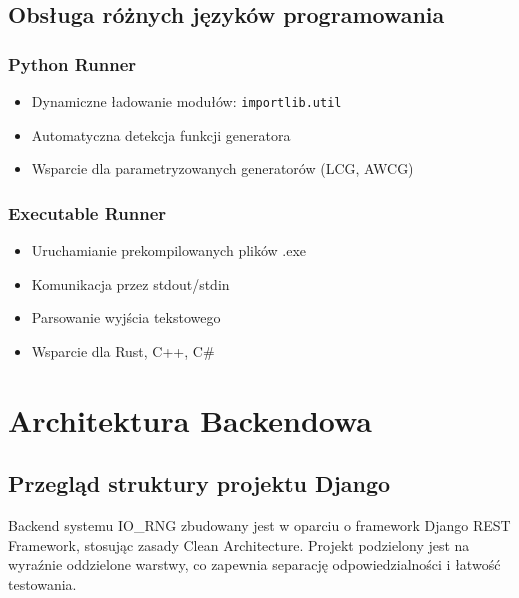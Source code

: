 \documentclass[12pt,a4paper]{article}
\begin{document}
\subsection{Obsługa różnych języków programowania}

\subsubsection{Python Runner}

\begin{itemize}
    \item Dynamiczne ładowanie modułów: \texttt{importlib.util}
    \item Automatyczna detekcja funkcji generatora
    \item Wsparcie dla parametryzowanych generatorów (LCG, AWCG)
\end{itemize}

\subsubsection{Executable Runner}

\begin{itemize}
    \item Uruchamianie prekompilowanych plików .exe
    \item Komunikacja przez stdout/stdin
    \item Parsowanie wyjścia tekstowego
    \item Wsparcie dla Rust, C++, C\#
\end{itemize}

\newpage

\section{Architektura Backendowa}

\subsection{Przegląd struktury projektu Django}

Backend systemu IO\_RNG zbudowany jest w oparciu o framework Django REST Framework, stosując zasady Clean Architecture. Projekt podzielony jest na wyraźnie oddzielone warstwy, co zapewnia separację odpowiedzialności i łatwość testowania.
\end{document}
